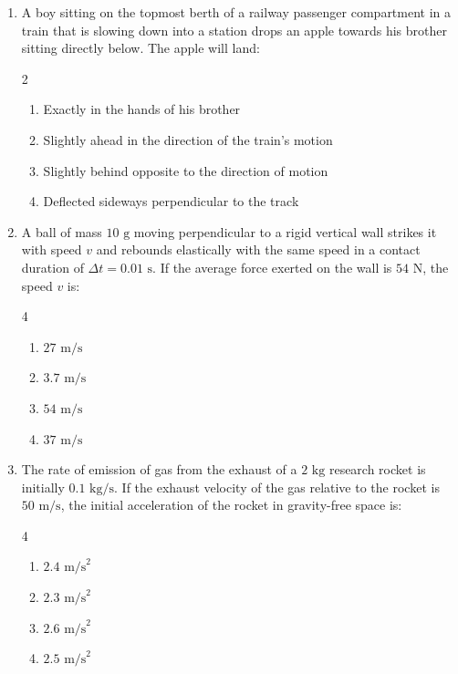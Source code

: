 \documentclass[11pt,a4paper]{article}
\begin{document}
\begin{enumerate}[label=\textbf{\arabic*.},leftmargin=18pt,itemsep=8pt,resume]
  \item A boy sitting on the topmost berth of a railway passenger compartment in a train that is slowing down into a station drops an apple towards his brother sitting directly below. The apple will land:
  \begin{multicols}{2}
    \begin{enumerate}[label=(\Alph*)]
      \item Exactly in the hands of his brother
      \item Slightly ahead in the direction of the train's motion
      \item Slightly behind opposite to the direction of motion
      \item Deflected sideways perpendicular to the track
    \end{enumerate}
  \end{multicols}

  \item A ball of mass $10\text{ g}$ moving perpendicular to a rigid vertical wall strikes it with speed $v$ and rebounds elastically with the same speed in a contact duration of $\Delta t = 0.01\text{ s}$. If the average force exerted on the wall is $54\text{ N}$, the speed $v$ is:
  \begin{multicols}{4}
    \begin{enumerate}[label=(\Alph*)]
      \item $27\text{ m/s}$
      \item $3.7\text{ m/s}$
      \item $54\text{ m/s}$
      \item $37\text{ m/s}$
    \end{enumerate}
  \end{multicols}

  \item The rate of emission of gas from the exhaust of a $2\text{ kg}$ research rocket is initially $0.1\text{ kg/s}$. If the exhaust velocity of the gas relative to the rocket is $50\text{ m/s}$, the initial acceleration of the rocket in gravity-free space is:
  \begin{multicols}{4}
    \begin{enumerate}[label=(\Alph*)]
      \item $2.4\text{ m/s}^2$
      \item $2.3\text{ m/s}^2$
      \item $2.6\text{ m/s}^2$
      \item $2.5\text{ m/s}^2$
    \end{enumerate}
  \end{multicols}


\end{enumerate}
\end{document}

